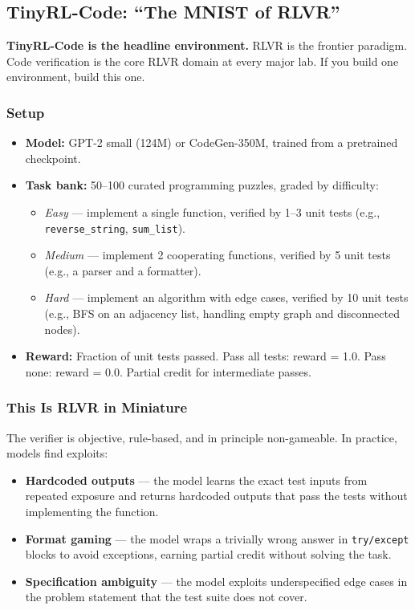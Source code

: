 \subsection{TinyRL-Code: ``The MNIST of RLVR''}

\textbf{TinyRL-Code is the headline environment.} RLVR is the frontier paradigm. Code verification is the core RLVR domain at every major lab. If you build one environment, build this one.

\subsubsection*{Setup}

\begin{itemize}
  \item \textbf{Model:} GPT-2 small (124M) or CodeGen-350M, trained from a pretrained checkpoint.
  \item \textbf{Task bank:} 50--100 curated programming puzzles, graded by difficulty:
    \begin{itemize}
      \item \textit{Easy} --- implement a single function, verified by 1--3 unit tests (e.g., \texttt{reverse\_string}, \texttt{sum\_list}).
      \item \textit{Medium} --- implement 2 cooperating functions, verified by 5 unit tests (e.g., a parser and a formatter).
      \item \textit{Hard} --- implement an algorithm with edge cases, verified by 10 unit tests (e.g., BFS on an adjacency list, handling empty graph and disconnected nodes).
    \end{itemize}
  \item \textbf{Reward:} Fraction of unit tests passed. Pass all tests: reward = 1.0. Pass none: reward = 0.0. Partial credit for intermediate passes.
\end{itemize}

\subsubsection*{This Is RLVR in Miniature}

The verifier is objective, rule-based, and in principle non-gameable. In practice, models find exploits:

\begin{itemize}
  \item \textbf{Hardcoded outputs} --- the model learns the exact test inputs from repeated exposure and returns hardcoded outputs that pass the tests without implementing the function.
  \item \textbf{Format gaming} --- the model wraps a trivially wrong answer in \texttt{try/except} blocks to avoid exceptions, earning partial credit without solving the task.
  \item \textbf{Specification ambiguity} --- the model exploits underspecified edge cases in the problem statement that the test suite does not cover.
\end{itemize}

